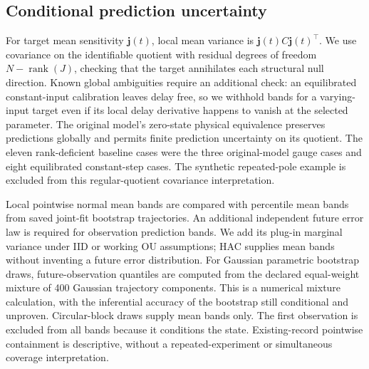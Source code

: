 \documentclass[11pt]{article}
\begin{document}
\subsection{Conditional prediction uncertainty}
For target mean sensitivity $\bm j(t)$, local mean variance is
$\bm j(t)C\bm j(t)^\top$. We use covariance on the identifiable quotient with
residual degrees of freedom $N-\operatorname{rank}(J)$, checking that the target
annihilates each structural null direction. Known global ambiguities require
an additional check: an equilibrated constant-input calibration leaves delay
free, so we withhold bands for a varying-input target even if its local delay
derivative happens to vanish at the selected parameter. The original model's
zero-state physical equivalence preserves predictions globally and permits
finite prediction uncertainty on its quotient.
The eleven rank-deficient baseline cases were the three original-model gauge
cases and eight equilibrated constant-step cases. The synthetic repeated-pole
example is excluded from this regular-quotient covariance interpretation.

Local pointwise normal mean bands are compared with percentile mean bands from
saved joint-fit bootstrap trajectories. An additional independent future error
law is required for observation prediction bands. We add its plug-in marginal
variance under IID or working OU assumptions; HAC supplies mean bands without
inventing a future error distribution. For Gaussian parametric bootstrap draws,
future-observation quantiles are computed from the declared equal-weight mixture
of 400 Gaussian trajectory components. This is a numerical mixture calculation,
with the inferential accuracy of the bootstrap still conditional and unproven.
Circular-block draws supply mean bands only. The first observation is excluded
from all bands because it conditions the state. Existing-record pointwise
containment is descriptive, without a repeated-experiment or simultaneous
coverage interpretation.
\end{document}

